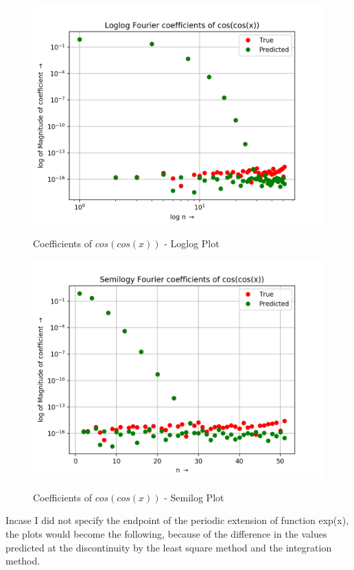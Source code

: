 \documentclass[11pt, a4paper]{article}
\begin{document}
\begin{figure}[H]
   	\centering
   	\includegraphics[scale=0.5]{loglog2p.png}
   	\label{fig:loglog2p}
   	\caption{Coefficients of $cos(cos(x))$ - Loglog Plot}
\end{figure}
\begin{figure}[H]
   	\centering
   	\includegraphics[scale=0.5]{semilog2p.png}
   	\label{fig:semilog2p}
   	\caption{Coefficients of $cos(cos(x))$ - Semilog Plot}
\end{figure}
Incase I did not specify the endpoint of the periodic extension of function exp(x), the plots would become the following, because of the difference in the values predicted at the discontinuity by the least square method and the integration method.
\end{document}
